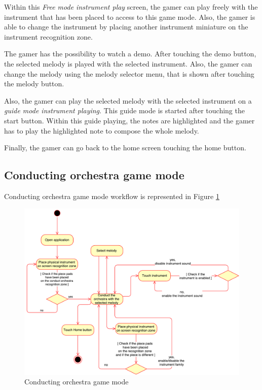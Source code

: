 Within this \textit{Free mode instrument play} screen, the gamer can play freely with the instrument that has been placed to access to this game mode. Also, the gamer is able to change the instrument by placing another instrument miniature on the instrument recognition zone.

The gamer has the possibility to watch a demo. After touching the demo button, the selected melody is played with the selected instrument. Also, the gamer can change the melody using the melody selector menu, that is shown after touching the melody button.

Also, the gamer can play the selected melody with the selected instrument on a \textit{guide mode instrument playing}. This guide mode is started after touching the start button. Within this guide playing, the notes are highlighted and the gamer has to play the highlighted note to compose the whole melody.

Finally, the gamer can go back to the home screen touching the home button.

\FloatBarrier

\newpage
\subsection{Conducting orchestra game mode}
\label{subsec:conducteorchestra_arch}

Conducting orchestra game mode workflow is represented in Figure \ref{fig:conductingworkflow}

\begin{figure}[ht!]
	\centering
	\includegraphics[width=400pt]{graphics/architecture/ConductingGameMode.pdf}
	\caption{Conducting orchestra game mode}
	\label{fig:conductingworkflow}
\end{figure}

